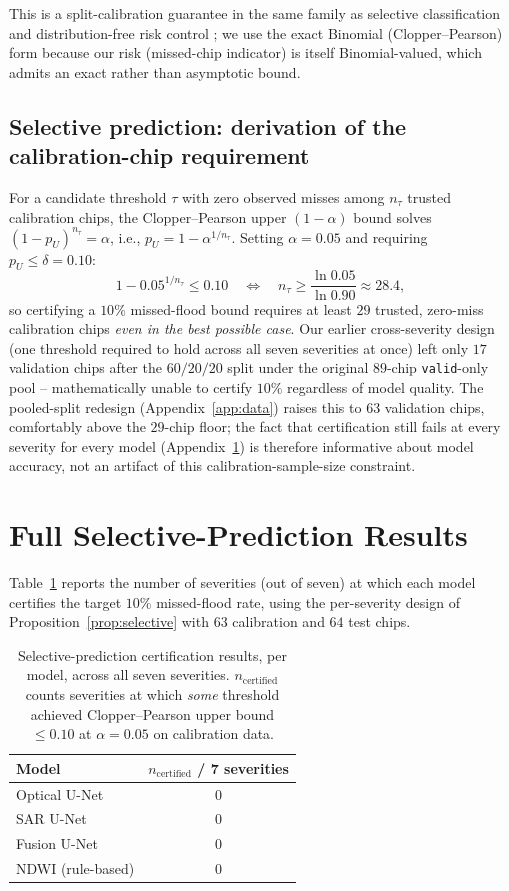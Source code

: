 \documentclass{article}
\begin{document}
This is a split-calibration guarantee in the same family as selective classification \citep{geifman2017selective} and distribution-free risk control \citep{bates2021distribution}; we use the exact Binomial (Clopper--Pearson) form because our risk (missed-chip indicator) is itself Binomial-valued, which admits an exact rather than asymptotic bound.

\subsection{Selective prediction: derivation of the calibration-chip requirement}
\label{app:powercalc}
For a candidate threshold $\tau$ with zero observed misses among $n_\tau$ trusted calibration chips, the Clopper--Pearson upper $(1-\alpha)$ bound solves $(1-p_U)^{n_\tau} = \alpha$, i.e., $p_U = 1 - \alpha^{1/n_\tau}$. Setting $\alpha = 0.05$ and requiring $p_U \le \delta = 0.10$:
\[
1 - 0.05^{1/n_\tau} \le 0.10 \quad\Longleftrightarrow\quad n_\tau \ge \frac{\ln 0.05}{\ln 0.90} \approx 28.4,
\]
so certifying a $10\%$ missed-flood bound requires at least $29$ trusted, zero-miss calibration chips \emph{even in the best possible case}. Our earlier cross-severity design (one threshold required to hold across all seven severities at once) left only $17$ validation chips after the $60/20/20$ split under the original $89$-chip \texttt{valid}-only pool -- mathematically unable to certify $10\%$ regardless of model quality. The pooled-split redesign (Appendix~\ref{app:data}) raises this to $63$ validation chips, comfortably above the $29$-chip floor; the fact that certification still fails at every severity for every model (Appendix~\ref{app:h3}) is therefore informative about model accuracy, not an artifact of this calibration-sample-size constraint.

\section{Full Selective-Prediction Results}
\label{app:h3}

Table~\ref{tab:h3full} reports the number of severities (out of seven) at which each model certifies the target $10\%$ missed-flood rate, using the per-severity design of Proposition~\ref{prop:selective} with $63$ calibration and $64$ test chips.

\begin{table}[h]
\centering
\caption{Selective-prediction certification results, per model, across all seven severities. $n_{\text{certified}}$ counts severities at which \emph{some} threshold achieved Clopper--Pearson upper bound $\le 0.10$ at $\alpha=0.05$ on calibration data.}
\label{tab:h3full}
\begin{tabular}{lc}
\toprule
Model & $n_{\text{certified}}$ / 7 severities \\
\midrule
Optical U-Net & 0 \\
SAR U-Net & 0 \\
Fusion U-Net & 0 \\
NDWI (rule-based) & 0 \\
\bottomrule
\end{tabular}
\end{table}
\end{document}
